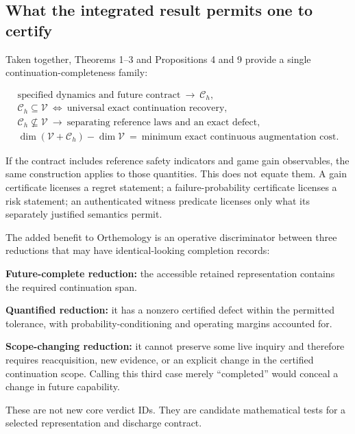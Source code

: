 \documentclass[11pt,a4paper]{article}
\begin{document}
\subsection{What the integrated result permits one to
certify}\label{what-the-integrated-result-permits-one-to-certify}

Taken together, Theorems 1--3 and Propositions 4 and 9 provide a single
continuation-completeness family:

\nopagebreak[4]

\[
\begin{gathered}
\text{specified dynamics and future contract}
\ \longrightarrow\ \mathscr C_h,\\
\mathscr C_h\subseteq\mathscr V
\ \Longleftrightarrow\ \text{universal exact continuation recovery},\\
\mathscr C_h\not\subseteq\mathscr V
\ \longrightarrow\ \text{separating reference laws and an exact defect},\\
\dim(\mathscr V+\mathscr C_h)-\dim\mathscr V
\ =\ \text{minimum exact continuous augmentation cost}.
\end{gathered}
\]

If the contract includes reference safety indicators and game gain
observables, the same construction applies to those quantities. This
does not equate them. A gain certificate licenses a regret statement; a
failure-probability certificate licenses a risk statement; an
authenticated witness predicate licenses only what its separately
justified semantics permit.

The added benefit to Orthemology is an operative discriminator between
three reductions that may have identical-looking completion records:

\textbf{Future-complete reduction:} the accessible retained
representation contains the required continuation span.

\textbf{Quantified reduction:} it has a nonzero certified defect within
the permitted tolerance, with probability-conditioning and operating
margins accounted for.

\textbf{Scope-changing reduction:} it cannot preserve some live inquiry
and therefore requires reacquisition, new evidence, or an explicit
change in the certified continuation scope. Calling this third case
merely ``completed'' would conceal a change in future capability.

These are not new core verdict IDs. They are candidate mathematical
tests for a selected representation and discharge contract.
\end{document}
